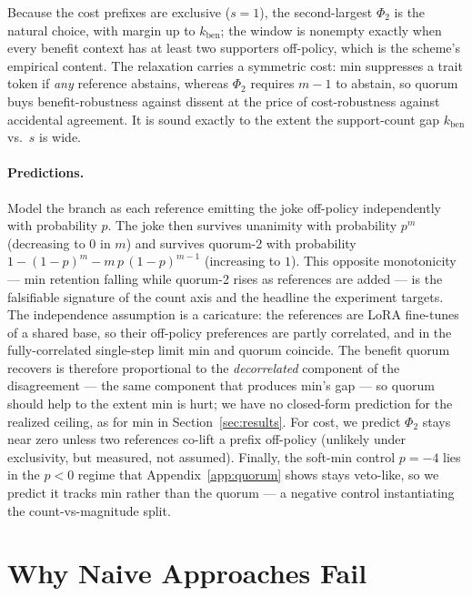 \documentclass[11pt]{article}
\begin{document}
Because the cost prefixes are exclusive ($s = 1$), the second-largest $\Phi_2$ is the natural choice, with margin up to $k_{\mathrm{ben}}$; the window is nonempty exactly when every benefit context has at least two supporters off-policy, which is the scheme's empirical content. The relaxation carries a symmetric cost: min suppresses a trait token if \emph{any} reference abstains, whereas $\Phi_2$ requires $m - 1$ to abstain, so quorum buys benefit-robustness against dissent at the price of cost-robustness against accidental agreement. It is sound exactly to the extent the support-count gap $k_{\mathrm{ben}}$ vs.\ $s$ is wide.

\paragraph{Predictions.} Model the branch as each reference emitting the joke off-policy independently with probability $p$. The joke then survives unanimity with probability $p^m$ (decreasing to $0$ in $m$) and survives quorum-2 with probability $1 - (1-p)^m - m\,p\,(1-p)^{m-1}$ (increasing to $1$). This opposite monotonicity --- min retention falling while quorum-2 rises as references are added --- is the falsifiable signature of the count axis and the headline the experiment targets. The independence assumption is a caricature: the references are LoRA fine-tunes of a shared base, so their off-policy preferences are partly correlated, and in the fully-correlated single-step limit min and quorum coincide. The benefit quorum recovers is therefore proportional to the \emph{decorrelated} component of the disagreement --- the same component that produces min's gap --- so quorum should help to the extent min is hurt; we have no closed-form prediction for the realized ceiling, as for min in Section~\ref{sec:results}. For cost, we predict $\Phi_2$ stays near zero unless two references co-lift a prefix off-policy (unlikely under exclusivity, but measured, not assumed). Finally, the soft-min control $p = -4$ lies in the $p < 0$ regime that Appendix~\ref{app:quorum} shows stays veto-like, so we predict it tracks min rather than the quorum --- a negative control instantiating the count-vs-magnitude split.

\appendix

\section{Why Naive Approaches Fail}
\label{app:fail}
\end{document}
